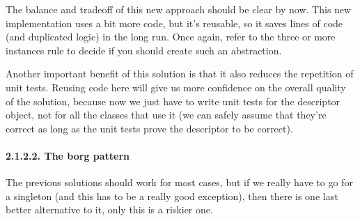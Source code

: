 \documentclass[a4paper,10pt,english]{sphinxmanual}
\begin{document}
\begin{sphinxVerbatim}[commandchars=\\\{\}]
 
      
      

       
          
          

     
         
         
\end{sphinxVerbatim}

The balance and trade\sphinxhyphen{}off of this new approach should be clear by now. This new
implementation uses a bit more code, but it’s reusable, so it saves lines of code (and
duplicated logic) in the long run. Once again, refer to the three or more instances rule to
decide if you should create such an abstraction.

Another important benefit of this solution is that it also reduces the repetition of unit tests.
Reusing code here will give us more confidence on the overall quality of the solution,
because now we just have to write unit tests for the descriptor object, not for all the classes
that use it (we can safely assume that they’re correct as long as the unit tests prove the
descriptor to be correct).


\paragraph{2.1.2.2. The borg pattern}
\label{\detokenize{chapters/9_design_patterns/index:the-borg-pattern}}
The previous solutions should work for most cases, but if we really have to go for a
singleton (and this has to be a really good exception), then there is one last better
alternative to it, only this is a riskier one.
\end{document}
